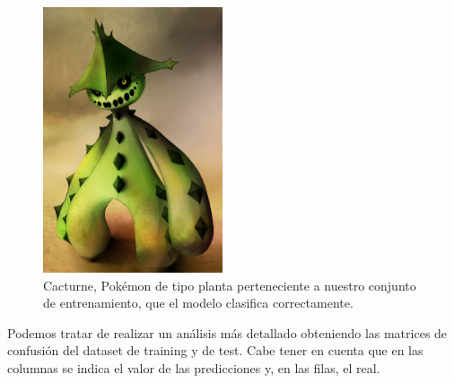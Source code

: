 \documentclass[
  12pt,
]{extreport}
\begin{document}
\begin{figure}[H]

{\centering \includegraphics[width=2.08333in,height=\textheight]{trabajo_images/cacturne.jpg}

}

\caption{Cacturne, Pokémon de tipo planta perteneciente a nuestro
conjunto de entrenamiento, que el modelo clasifica correctamente.}

\end{figure}%

Podemos tratar de realizar un análisis más detallado obteniendo las
matrices de confusión del dataset de training y de test. Cabe tener en
cuenta que en las columnas se indica el valor de las predicciones y, en
las filas, el real.
\end{document}
